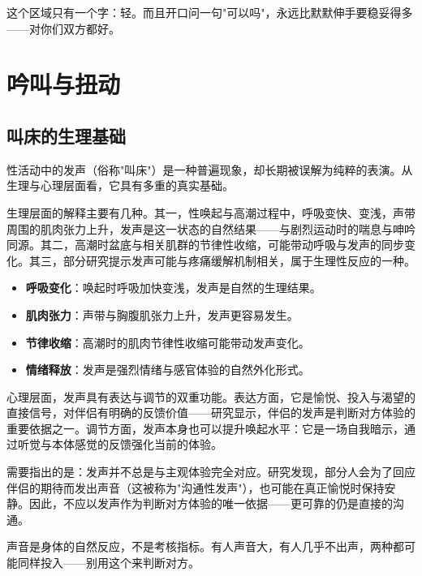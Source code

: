 \documentclass[12pt,UTF8]{ctexbook}
\newcommand{\keyword}[1]{\textbf{#1}}
\begin{document}
\begin{tcolorbox}[colback=pink!5!white,colframe=red!50!black,title=贴心小叮咛]
这个区域只有一个字：轻。而且开口问一句"可以吗"，永远比默默伸手要稳妥得多——对你们双方都好。
\end{tcolorbox}

\section{吟叫与扭动}
\subsection{叫床的生理基础}

性活动中的发声（俗称"叫床"）是一种普遍现象，却长期被误解为纯粹的表演。从生理与心理层面看，它具有多重的真实基础。

生理层面的解释主要有几种。其一，性唤起与高潮过程中，呼吸变快、变浅，声带周围的肌肉张力上升，发声是这一状态的自然结果——与剧烈运动时的喘息与呻吟同源。其二，高潮时盆底与相关肌群的节律性收缩，可能带动呼吸与发声的同步变化。其三，部分研究提示发声可能与疼痛缓解机制相关，属于生理性反应的一种。

\begin{itemize}
  \item \keyword{呼吸变化}：唤起时呼吸加快变浅，发声是自然的生理结果。
  \item \keyword{肌肉张力}：声带与胸腹肌张力上升，发声更容易发生。
  \item \keyword{节律收缩}：高潮时的肌肉节律性收缩可能带动发声变化。
  \item \keyword{情绪释放}：发声是强烈情绪与感官体验的自然外化形式。
\end{itemize}

心理层面，发声具有表达与调节的双重功能。表达方面，它是愉悦、投入与渴望的直接信号，对伴侣有明确的反馈价值——研究显示，伴侣的发声是判断对方体验的重要依据之一。调节方面，发声本身也可以提升唤起水平：它是一场自我暗示，通过听觉与本体感觉的反馈强化当前的体验。

需要指出的是：发声并不总是与主观体验完全对应。研究发现，部分人会为了回应伴侣的期待而发出声音（这被称为"沟通性发声"），也可能在真正愉悦时保持安静。因此，不应以发声作为判断对方体验的唯一依据——更可靠的仍是直接的沟通。

\begin{tcolorbox}[colback=pink!5!white,colframe=red!50!black,title=贴心小叮咛]
声音是身体的自然反应，不是考核指标。有人声音大，有人几乎不出声，两种都可能同样投入——别用这个来判断对方。
\end{tcolorbox}
\end{document}
